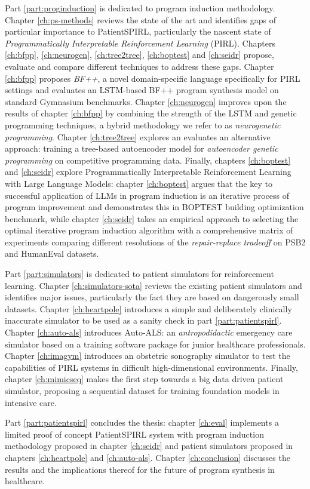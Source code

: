 Part \ref{part:proginduction} is dedicated to program induction methodology.
Chapter \ref{ch:ps-methods} reviews the state of the art and identifies gaps of particular importance to PatientSPIRL, particularly the nascent state of \emph{Programmatically Interpretable Reinforcement Learning} (PIRL).
Chapters \ref{ch:bfpp}, \ref{ch:neurogen}, \ref{ch:tree2tree}, \ref{ch:boptest} and \ref{ch:seidr} propose, evaluate and compare different techniques to address these gaps.
Chapter \ref{ch:bfpp} proposes \emph{BF++}, a novel domain-specific language specifically for PIRL settings and evaluates an LSTM-based BF++ program synthesis model on standard Gymnasium \cite{towersGymnasiumStandardInterface2024} benchmarks.
Chapter \ref{ch:neurogen} improves upon the results of chapter \ref{ch:bfpp} by combining the strength of the LSTM and genetic programming techniques, a hybrid methodology we refer to as \emph{neurogenetic programming}.
Chapter \ref{ch:tree2tree} explores an evaluates an alternative approach: training a tree-based autoencoder model for \emph{autoencoder genetic programming} on competitive programming data.
Finally, chapters \ref{ch:boptest} and \ref{ch:seidr} explore Programmatically Interpretable Reinforcement Learning with Large Language Models: chapter \ref{ch:boptest} argues that the key to successful application of LLMs in program induction is an iterative process of program improvement and demonstrates this in BOPTEST building optimization benchmark, while chapter \ref{ch:seidr} takes an empirical approach to selecting the optimal iterative program induction algorithm with a comprehensive matrix of experiments comparing different resolutions of the \emph{repair-replace tradeoff} on PSB2 and HumanEval datasets.

Part \ref{part:simulators} is dedicated to patient simulators for reinforcement learning.
Chapter \ref{ch:simulators-sota} reviews the existing patient simulators and identifies major issues, particularly the fact they are based on dangerously small datasets.
Chapter \ref{ch:heartpole} introduces a simple and deliberately clinically inaccurate simulator to be used as a sanity check in part \ref{part:patientspirl}.
Chapter \ref{ch:auto-als} introduces Auto-ALS: an \emph{antropodidactic} emergency care simulator based on a training software package for junior healthcare professionals.
Chapter \ref{ch:imagym} introduces an obstetric sonography simulator to test the capabilities of PIRL systems in difficult high-dimensional environments.
Finally, chapter \ref{ch:mimicseq} makes the first step towards a big data driven patient simulator, proposing a sequential dataset for training foundation models in intensive care.

Part \ref{part:patientspirl} concludes the thesis: chapter \ref{ch:eval} implements a limited proof of concept PatientSPIRL system with program induction methodology proposed in chapter \ref{ch:seidr} and patient simulators proposed in chapters \ref{ch:heartpole} and \ref{ch:auto-als}.
Chapter \ref{ch:conclusion} discusses the results and the implications thereof for the future of program synthesis in healthcare.